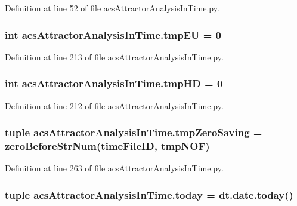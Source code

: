 Definition at line 52 of file acs\-Attractor\-Analysis\-In\-Time.\-py.

\hypertarget{a00097_a9019a56cfd992899ffc519204307a8ae}{
\subsubsection[{tmp\-E\-U}]{\setlength{\rightskip}{0pt plus 5cm}int acs\-Attractor\-Analysis\-In\-Time.\-tmp\-E\-U = 0}}\label{a00097_a9019a56cfd992899ffc519204307a8ae}


Definition at line 213 of file acs\-Attractor\-Analysis\-In\-Time.\-py.

\hypertarget{a00097_a35b7af9eb7cd962d33c5d56eae794c7b}{
\subsubsection[{tmp\-H\-D}]{\setlength{\rightskip}{0pt plus 5cm}int acs\-Attractor\-Analysis\-In\-Time.\-tmp\-H\-D = 0}}\label{a00097_a35b7af9eb7cd962d33c5d56eae794c7b}


Definition at line 212 of file acs\-Attractor\-Analysis\-In\-Time.\-py.

\hypertarget{a00097_ae86fc9dc3283934244ec28446445f722}{
\subsubsection[{tmp\-Zero\-Saving}]{\setlength{\rightskip}{0pt plus 5cm}tuple acs\-Attractor\-Analysis\-In\-Time.\-tmp\-Zero\-Saving = {\bf zero\-Before\-Str\-Num}(time\-File\-I\-D, tmp\-N\-O\-F)}}\label{a00097_ae86fc9dc3283934244ec28446445f722}


Definition at line 263 of file acs\-Attractor\-Analysis\-In\-Time.\-py.

\hypertarget{a00097_af30cd903eabfe4c9167f2a5d0062a4ce}{
\subsubsection[{today}]{\setlength{\rightskip}{0pt plus 5cm}tuple acs\-Attractor\-Analysis\-In\-Time.\-today = dt.\-date.\-today()}}\label{a00097_af30cd903eabfe4c9167f2a5d0062a4ce}


